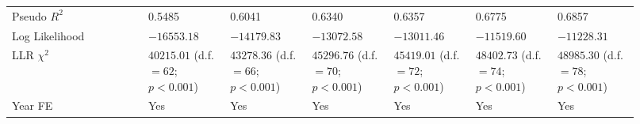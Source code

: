 {\begin{longtable}{p{0.2\linewidth}p{0.12\linewidth}p{0.12\linewidth}p{0.12\linewidth}p{0.12\linewidth}p{0.12\linewidth}p{0.12\linewidth}}
Pseudo $R^2$ & 0.5485 & 0.6041 & 0.6340 & 0.6357 & 0.6775 & 0.6857 \\ 
Log Likelihood & $-16553.18$ & $-14179.83$ & $-13072.58$ & $-13011.46$ & $-11519.60$ & $-11228.31$ \\ 
LLR $\chi^2$  & $40215.01$ (d.f. $= 62$; ${p < 0.001}$) & $43278.36$ (d.f. $= 66$; ${p < 0.001}$) & $45296.76$ (d.f. $= 70$; ${p < 0.001}$) & $45419.01$ (d.f. $= 72$; ${p < 0.001}$) & $48402.73$ (d.f. $= 74$; ${p < 0.001}$) & $48985.30$ (d.f. $= 78$; ${p < 0.001}$) \\ 
Year FE  & Yes & Yes & Yes & Yes & Yes & Yes \\ 
\hline 
\end{longtable} } 
